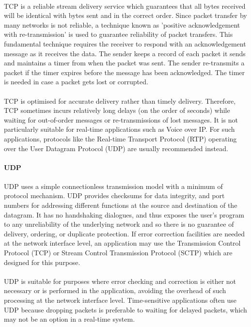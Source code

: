\paragraph{}
TCP is a reliable stream delivery service which guarantees that all bytes received will be identical with bytes sent and in the correct order. Since packet transfer by many networks is not reliable, a technique known as 'positive acknowledgement with re-transmission' is used to guarantee reliability of packet transfers. This fundamental technique requires the receiver to respond with an acknowledgement message as it receives the data. The sender keeps a record of each packet it sends and maintains a timer from when the packet was sent. The sender re-transmits a packet if the timer expires before the message has been acknowledged. The timer is needed in case a packet gets lost or corrupted.
\paragraph{}
TCP is optimised for accurate delivery rather than timely delivery. Therefore, TCP sometimes incurs relatively long delays (on the order of seconds) while waiting for out-of-order messages or re-transmissions of lost messages. It is not particularly suitable for real-time applications such as Voice over IP. For such applications, protocols like the Real-time Transport Protocol (RTP) operating over the User Datagram Protocol (UDP) are usually recommended instead.

\paragraph{} \textbf{UDP}
\paragraph{}
UDP uses a simple connectionless transmission model with a minimum of protocol mechanism. UDP provides checksums for data integrity, and port numbers for addressing different functions at the source and destination of the datagram. It has no handshaking dialogues, and thus exposes the user's program to any unreliability of the underlying network and so there is no guarantee of delivery, ordering, or duplicate protection. If error correction facilities are needed at the network interface level, an application may use the Transmission Control Protocol (TCP) or Stream Control Transmission Protocol (SCTP) which are designed for this purpose.
\paragraph{}
UDP is suitable for purposes where error checking and correction is either not necessary or is performed in the application, avoiding the overhead of such processing at the network interface level. Time-sensitive applications often use UDP because dropping packets is preferable to waiting for delayed packets, which may not be an option in a real-time system.

